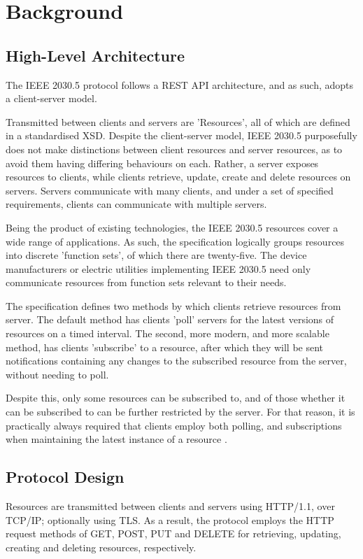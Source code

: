\chapter{Background}\label{ch:background}

\section{High-Level Architecture}
The IEEE 2030.5 protocol follows a REST API architecture, and as such, adopts a client-server model.

Transmitted between clients and servers are 'Resources', all of which are defined in a standardised XSD. 
Despite the client-server model, IEEE 2030.5 purposefully does not make distinctions between client resources and server resources, as to avoid them having differing behaviours on each. Rather, a server exposes resources to clients, while clients retrieve, update, create and delete resources on servers.
Servers communicate with many clients, and under a set of specified requirements, clients can communicate with multiple servers.

Being the product of existing technologies, the IEEE 2030.5 resources cover a wide range of applications. As such, the specification logically groups resources into discrete 'function sets', of which there are twenty-five. 
The device manufacturers or electric utilities implementing IEEE 2030.5 need only communicate resources from function sets relevant to their needs.

The specification defines two methods by which clients retrieve resources from server. The default method has clients 'poll' servers for the latest versions of resources on a timed interval.
The second, more modern, and more scalable method, has clients 'subscribe' to a resource, after which they will be sent notifications containing any changes to the subscribed resource from the server, without needing to poll.

Despite this, only some resources can be subscribed to, and of those whether it can be subscribed to can be further restricted by the server.
For that reason, it is practically always required that clients employ both polling, and subscriptions when maintaining the latest instance of a resource \cite{AUSDOE} \cite{IEEE2030.5}. 

\section{Protocol Design}
Resources are transmitted between clients and servers using HTTP/1.1, over TCP/IP; optionally using TLS.
As a result, the protocol employs the HTTP request methods of GET, POST, PUT and DELETE for retrieving, updating, creating and deleting resources, respectively.

